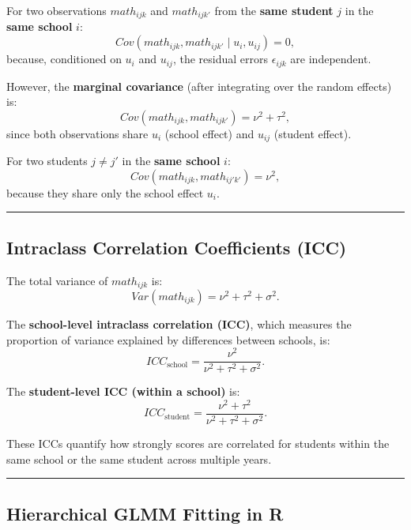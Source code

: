 \documentclass[
  letterpaper,
  DIV=11,
  numbers=noendperiod]{scrreprt}
\begin{document}
For two observations \(math_{ijk}\) and \(math_{ijk'}\) from the
\textbf{same student} \(j\) in the \textbf{same school} \(i\): \[
Cov(math_{ijk}, math_{ijk'} \mid u_i, u_{ij}) = 0,
\] because, conditioned on \(u_i\) and \(u_{ij}\), the residual errors
\(\epsilon_{ijk}\) are independent.

However, the \textbf{marginal covariance} (after integrating over the
random effects) is: \[
Cov(math_{ijk}, math_{ijk'}) = \nu^2 + \tau^2,
\] since both observations share \(u_i\) (school effect) and \(u_{ij}\)
(student effect).

For two students \(j \neq j'\) in the \textbf{same school} \(i\): \[
Cov(math_{ijk}, math_{ij'k'}) = \nu^2,
\] because they share only the school effect \(u_i\).

\begin{center}\rule{0.5\linewidth}{0.5pt}\end{center}

\hypertarget{intraclass-correlation-coefficients-icc}{%
\subsection*{Intraclass Correlation Coefficients
(ICC)}\label{intraclass-correlation-coefficients-icc}}

The total variance of \(math_{ijk}\) is: \[
Var(math_{ijk}) = \nu^2 + \tau^2 + \sigma^2.
\]

The \textbf{school-level intraclass correlation (ICC)}, which measures
the proportion of variance explained by differences between schools, is:
\[
ICC_{\text{school}} = \frac{\nu^2}{\nu^2 + \tau^2 + \sigma^2}.
\]

The \textbf{student-level ICC (within a school)} is: \[
ICC_{\text{student}} = \frac{\nu^2 + \tau^2}{\nu^2 + \tau^2 + \sigma^2}.
\]

These ICCs quantify how strongly scores are correlated for students
within the same school or the same student across multiple years.

\begin{center}\rule{0.5\linewidth}{0.5pt}\end{center}

\hypertarget{hierarchical-glmm-fitting-in-r}{%
\subsection*{Hierarchical GLMM Fitting in
R}\label{hierarchical-glmm-fitting-in-r}}
\end{document}
